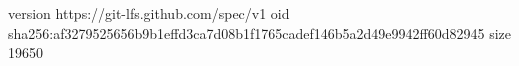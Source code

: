 version https://git-lfs.github.com/spec/v1
oid sha256:af3279525656b9b1effd3ca7d08b1f1765cadef146b5a2d49e9942ff60d82945
size 19650

